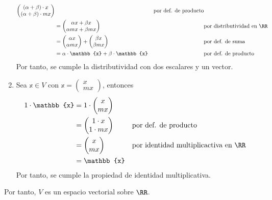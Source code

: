 \begin{examplebox}{}{}
\begin{enumerate}[label=\roman*), topsep=6pt, itemsep=0pt]
\begin{align*}
\begin{pmatrix}
                (\alpha + \beta) \cdot x \\
                (\alpha + \beta) \cdot mx
            \end{pmatrix} && \text{por def. de producto} \\
            & = \begin{pmatrix}
                \alpha x + \beta x \\
                \alpha mx + \beta mx
            \end{pmatrix} && \text{por distributividad en $\RR$} \\
            & = \begin{pmatrix}
                \alpha x \\
                \alpha mx
            \end{pmatrix} + \begin{pmatrix}
                \beta x \\
                \beta mx
            \end{pmatrix} && \text{por def. de suma} \\
            & = \alpha \cdot \mathbb{x} + \beta \cdot \mathbb{x} && \text{por def. de producto}
        \end{align*}
        Por tanto, se cumple la distributividad con dos escalares y un vector.
        \item Sea $\mathbb{x} \in V$ con $\mathbb{x} = \begin{pmatrix}
            x \\
            mx
        \end{pmatrix}$, entonces
        \begin{align*}
            1 \cdot \mathbb{x} & = 1 \cdot \begin{pmatrix}
                x \\
                mx
            \end{pmatrix} \\
            & = \begin{pmatrix}
                1 \cdot x \\
                1 \cdot mx
            \end{pmatrix} && \text{por def. de producto} \\
            & = \begin{pmatrix}
                x \\
                mx
            \end{pmatrix} && \text{por identidad multiplicactiva en $\RR$} \\
            & = \mathbb{x}
        \end{align*}
        Por tanto, se cumple la propiedad de identidad multiplicativa.
    \end{enumerate}
    Por tanto, $V$ es un espacio vectorial sobre $\RR$.
\end{examplebox}
